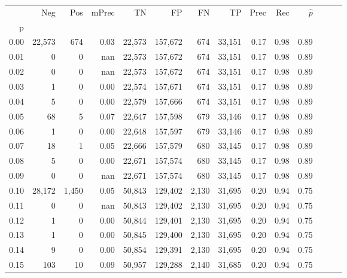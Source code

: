 \begin{tabular}{rrrrrrrrrrrrrr}
\toprule
{} &     Neg &    Pos & mPrec &       TN &       FP &      FN &      TP &  Prec &   Rec & $\hat{p}$ \\
p    &         &        &       &          &          &         &         &       &       &           \\
\midrule
0.00 &  22,573 &    674 &  0.03 &   22,573 &  157,672 &     674 &  33,151 &  0.17 &  0.98 &      0.89 \\
0.01 &       0 &      0 &   nan &   22,573 &  157,672 &     674 &  33,151 &  0.17 &  0.98 &      0.89 \\
0.02 &       0 &      0 &   nan &   22,573 &  157,672 &     674 &  33,151 &  0.17 &  0.98 &      0.89 \\
0.03 &       1 &      0 &  0.00 &   22,574 &  157,671 &     674 &  33,151 &  0.17 &  0.98 &      0.89 \\
0.04 &       5 &      0 &  0.00 &   22,579 &  157,666 &     674 &  33,151 &  0.17 &  0.98 &      0.89 \\
0.05 &      68 &      5 &  0.07 &   22,647 &  157,598 &     679 &  33,146 &  0.17 &  0.98 &      0.89 \\
0.06 &       1 &      0 &  0.00 &   22,648 &  157,597 &     679 &  33,146 &  0.17 &  0.98 &      0.89 \\
0.07 &      18 &      1 &  0.05 &   22,666 &  157,579 &     680 &  33,145 &  0.17 &  0.98 &      0.89 \\
0.08 &       5 &      0 &  0.00 &   22,671 &  157,574 &     680 &  33,145 &  0.17 &  0.98 &      0.89 \\
0.09 &       0 &      0 &   nan &   22,671 &  157,574 &     680 &  33,145 &  0.17 &  0.98 &      0.89 \\
0.10 &  28,172 &  1,450 &  0.05 &   50,843 &  129,402 &   2,130 &  31,695 &  0.20 &  0.94 &      0.75 \\
0.11 &       0 &      0 &   nan &   50,843 &  129,402 &   2,130 &  31,695 &  0.20 &  0.94 &      0.75 \\
0.12 &       1 &      0 &  0.00 &   50,844 &  129,401 &   2,130 &  31,695 &  0.20 &  0.94 &      0.75 \\
0.13 &       1 &      0 &  0.00 &   50,845 &  129,400 &   2,130 &  31,695 &  0.20 &  0.94 &      0.75 \\
0.14 &       9 &      0 &  0.00 &   50,854 &  129,391 &   2,130 &  31,695 &  0.20 &  0.94 &      0.75 \\
0.15 &     103 &     10 &  0.09 &   50,957 &  129,288 &   2,140 &  31,685 &  0.20 &  0.94 &      0.75 \\

\end{tabular}
